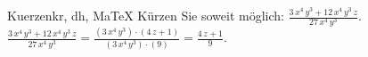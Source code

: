 \begin{MAufgabe}{Kuerzen}{kr, dh, MaTeX}
K\"urzen Sie soweit m\"oglich: $\frac{3\, x^4\, y^3 + 12\, x^4\, y^3\, z}{27\, x^4\, y^3}$.\\ 
\ifLsg\MLoesung
\quad $\frac{3\, x^4\, y^3 + 12\, x^4\, y^3\, z}{27\, x^4\, y^3}=\frac{(3\, x^4\, y^3)\cdot(4\, z + 1)}{(3\, x^4\, y^3)\cdot(9)}=\frac{4\, z + 1}{9}$.\else\relax\fi
 \end{MAufgabe}